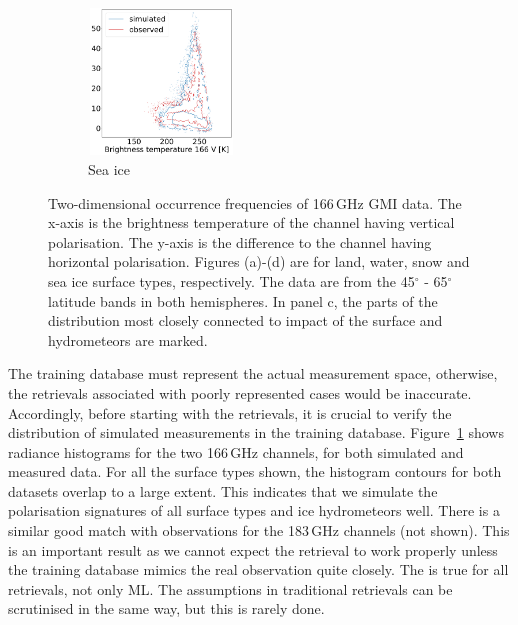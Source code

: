 \documentclass[12pt,oneside,a4paper]{article}
\begin{document}
\begin{figure}[t]
\begin{subfigure}{.24\textwidth}
	\caption{Sea ice}
	\includegraphics[height = 39mm, width = 39mm]{Figures/hist2d_gmi_highlat_sea-ice.pdf}
\end{subfigure}
\caption{Two-dimensional occurrence frequencies of 166\,GHz GMI data. The x-axis
  is the brightness temperature of the channel having vertical polarisation.
  The y-axis is the difference to the channel having horizontal polarisation.
  Figures (a)-(d) are for land, water, snow and sea ice surface types,
  respectively. The data are from the 45$^\circ$ - 65$^\circ$ latitude bands in
  both hemispheres. In panel c, the parts of the distribution most closely
  connected to impact of the surface and hydrometeors are marked.}
  \label{fig:histogram_2d}
\end{figure}

The training database must represent the actual measurement space, otherwise,
the retrievals associated with poorly represented cases would be inaccurate.
Accordingly, before starting with the retrievals, it is crucial to verify the
distribution of simulated measurements in the training database.
Figure~\ref{fig:histogram_2d} shows radiance histograms for the two 166\,GHz
channels, for both simulated and measured data. For all the surface types
shown, the histogram contours for both datasets overlap to a large extent. This
indicates that we simulate the polarisation signatures of all surface types and
ice hydrometeors well. There is a similar good match with observations for the
183\,GHz channels (not shown). This is an important result as we cannot expect
the retrieval to work properly unless the training database mimics the real
observation quite closely. The is true for all retrievals, not only ML. The
assumptions in traditional retrievals can be scrutinised in the same way, but
this is rarely done.
\end{document}
